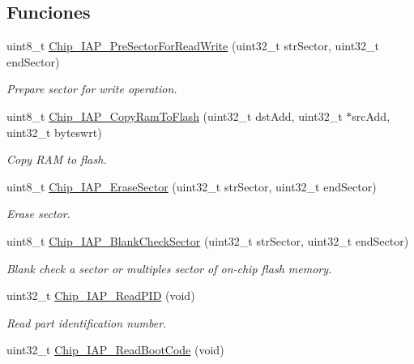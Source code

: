 \subsection*{Funciones}
\begin{DoxyCompactItemize}
\item 
uint8\+\_\+t \hyperlink{group___c_o_m_m_o_n___i_a_p_gac45b60745e55670c7fa806e2865625c4}{Chip\+\_\+\+I\+A\+P\+\_\+\+Pre\+Sector\+For\+Read\+Write} (uint32\+\_\+t str\+Sector, uint32\+\_\+t end\+Sector)
\begin{DoxyCompactList}\small\item\em Prepare sector for write operation. \end{DoxyCompactList}\item 
uint8\+\_\+t \hyperlink{group___c_o_m_m_o_n___i_a_p_ga71cb8cde86dc344b05219cdf1ecee638}{Chip\+\_\+\+I\+A\+P\+\_\+\+Copy\+Ram\+To\+Flash} (uint32\+\_\+t dst\+Add, uint32\+\_\+t $\ast$src\+Add, uint32\+\_\+t byteswrt)
\begin{DoxyCompactList}\small\item\em Copy R\+AM to flash. \end{DoxyCompactList}\item 
uint8\+\_\+t \hyperlink{group___c_o_m_m_o_n___i_a_p_ga02dbb90a49e24dc449d45a66f03a4a2d}{Chip\+\_\+\+I\+A\+P\+\_\+\+Erase\+Sector} (uint32\+\_\+t str\+Sector, uint32\+\_\+t end\+Sector)
\begin{DoxyCompactList}\small\item\em Erase sector. \end{DoxyCompactList}\item 
uint8\+\_\+t \hyperlink{group___c_o_m_m_o_n___i_a_p_ga98c7e657a618cf004a8967112dae1a30}{Chip\+\_\+\+I\+A\+P\+\_\+\+Blank\+Check\+Sector} (uint32\+\_\+t str\+Sector, uint32\+\_\+t end\+Sector)
\begin{DoxyCompactList}\small\item\em Blank check a sector or multiples sector of on-\/chip flash memory. \end{DoxyCompactList}\item 
uint32\+\_\+t \hyperlink{group___c_o_m_m_o_n___i_a_p_gaa4b90551649db0627dc195acfc834cbe}{Chip\+\_\+\+I\+A\+P\+\_\+\+Read\+P\+ID} (void)
\begin{DoxyCompactList}\small\item\em Read part identification number. \end{DoxyCompactList}\item 
uint32\+\_\+t \hyperlink{group___c_o_m_m_o_n___i_a_p_ga82606d40a83c8025d59fd6e8b76676ba}{Chip\+\_\+\+I\+A\+P\+\_\+\+Read\+Boot\+Code} (void)

\end{DoxyCompactItemize}
